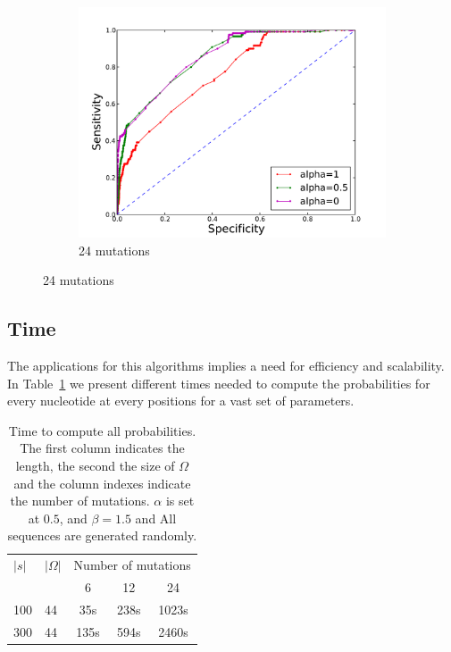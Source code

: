 \begin{figure}
\begin{subfigure}[b]{0.3\textwidth}
\includegraphics[width=1.2\textwidth]{figures/ROC_24.pdf}
\caption{24 mutations}
\end{subfigure}
\end{figure}




\subsection{Time}
The applications for this algorithms implies a need for efficiency
and scalability. In Table~\ref{tab:time} we
present different times needed to compute the probabilities for
 every nucleotide at every positions for a vast set of parameters.

\begin{table}
\begin{center}
\begin{tabular}{llccc}
$|s|$&$|\Omega|$&\multicolumn{3}{c}{Number of mutations}\\\cline{3-5}
		 & 				  & 6   &  12  & 24\\\cline{3-5}
100  & 44				& 35s  & 238s & 1023s\\
300  & 44				& 135s & 594s &2460s\\

\end{tabular}
\end{center}
\caption{Time to compute all probabilities. The first column indicates the length, the second
 the size of $\Omega$ and  the column indexes indicate the number
 of mutations. $\alpha$ is
set at $0.5$, and $\beta=1.5$ and All sequences are generated randomly.}
\label{tab:time}
\end{table}
